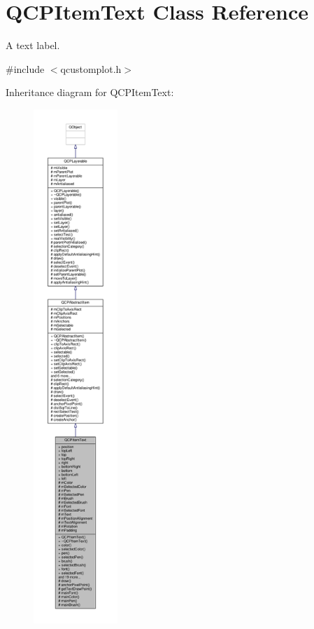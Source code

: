 \hypertarget{class_q_c_p_item_text}{}\section{Q\+C\+P\+Item\+Text Class Reference}
\label{class_q_c_p_item_text}


A text label.  




{\ttfamily \#include $<$qcustomplot.\+h$>$}



Inheritance diagram for Q\+C\+P\+Item\+Text\+:\nopagebreak
\begin{figure}[H]
\begin{center}
\leavevmode
\includegraphics[height=550pt]{class_q_c_p_item_text__inherit__graph}
\end{center}
\end{figure}


